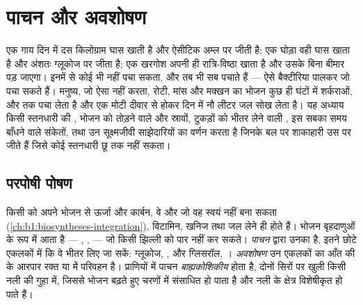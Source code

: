 \chapter{पाचन और अवशोषण}\label{ch:b1:digestion-absorption}

एक गाय दिन में दस किलोग्राम घास खाती है और ऐसीटिक अम्ल पर जीती है; एक
घोड़ा वही घास खाता है और अंशतः ग्लूकोज पर जीता है; एक खरगोश अपनी ही
रात्रि-विष्ठा खाता है और उसके बिना बीमार पड़ जाएगा। इनमें से कोई भी
 नहीं पचा सकता, और तब भी सब पचाते हैं --- ऐसे बैक्टीरिया पालकर जो
पचा सकते हैं। मनुष्य, जो ऐसा नहीं करता, रोटी, मांस और मक्खन का भोजन कुछ
ही घंटों में शर्कराओं,  और  तक पचा लेता है और एक
 मोटी दीवार से होकर दिन में नौ लीटर जल सोख लेता है। यह अध्याय किसी
स्तनधारी की , भोजन को तोड़ने वाले  और स्रावों, टुकड़ों को
भीतर लेने वाली , इस सबका समय बाँधने वाले संकेतों, तथा उन
सूक्ष्मजीवी साझेदारियों का वर्णन करता है जिनके बल पर शाकाहारी उस पर जीते
हैं जिसे कोई स्तनधारी  छू तक नहीं सकता।

\section{परपोषी पोषण}

\begin{definition}[पोषण, पाचन, अवशोषण]\label{def:b1:digestion-absorption:nutrition}
किसी  को अपने भोजन से ऊर्जा और कार्बन, वे  और 
जो वह स्वयं नहीं बना सकता (\cref{ch:b1:biosyntheses-integration}),
विटामिन, खनिज तथा जल लेने ही होते हैं। भोजन बृहदाणुओं के रूप में आता है
--- , ,  --- जो किसी झिल्ली को पार नहीं कर सकते।
\emph{पाचन}  द्वारा उनका  है, इतने छोटे एकलकों में कि वे
भीतर लिए जा सकें: ग्लूकोज, ,  और ग्लिसरॉल,
। \emph{अवशोषण} उन एकलकों का आँत की  के आरपार रक्त
या  में परिवहन है। प्राणियों में पाचन \emph{बाह्यकोशिकीय} होता है,
दोनों सिरों पर खुली किसी नली की गुहा में, जिससे भोजन बढ़ते हुए चरणों में
संसाधित हो पाता है और नली के क्षेत्र विशेषीकृत हो पाते हैं।
\end{definition}


